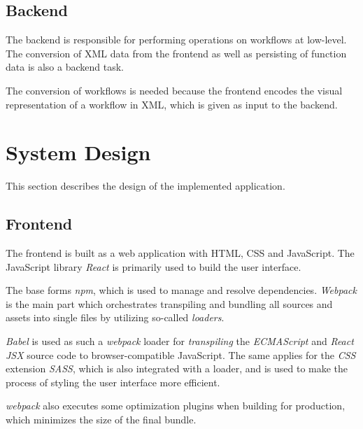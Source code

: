 \documentclass[a4paper,12pt,pdftex,halfparskip,cleardoubleempty,bibtotoc,liststotoc]{scrbook}
\begin{document}

\subsection{Backend}

The backend is responsible for performing operations on workflows at low-level. The conversion of XML data from the frontend as well as persisting of function data is also a backend task.

The conversion of workflows is needed because the frontend encodes the visual representation of a workflow in XML, which is given as input to the backend. 




\section{System Design}

This  section  describes  the  design  of  the  implemented  application.

\subsection{Frontend}
The frontend is built as a web application with HTML, CSS and JavaScript.
The JavaScript library \textit{React} is primarily used to build the user interface.

The base forms \textit{npm}, which is used to manage and resolve dependencies.  \textit{Webpack} is the main part which orchestrates transpiling and bundling all sources and assets into single files by utilizing so-called \textit{loaders}.

\textit{Babel} is used as such a \textit{webpack} loader for \textit{transpiling} the \textit{ECMAScript} and \textit{React JSX} source code to browser-compatible JavaScript.
The same applies for the \textit{CSS} extension \textit{SASS}, which is also integrated with a loader, and is used to make the process of styling the user interface more efficient.

\textit{webpack} also executes some optimization plugins when building for production, which minimizes the size of the final bundle.
\end{document}
